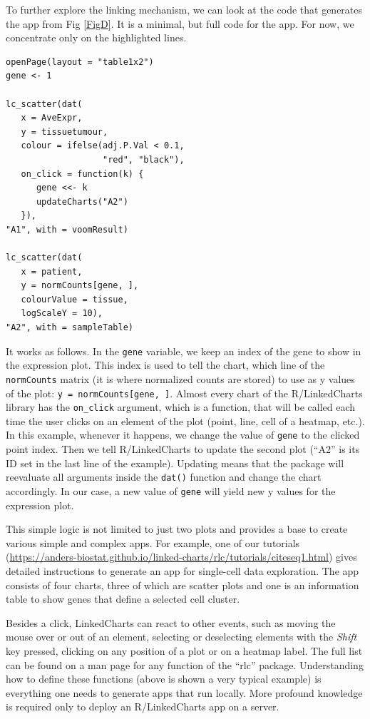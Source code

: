 \documentclass[twocolumn,10pt]{article}
\begin{document}
To further explore the linking mechanism, we can look at the code that generates the app from Fig \ref{FigD}. It is a minimal, but full code for the app. For now, we concentrate only on the highlighted lines.

\begin{verbatim}
openPage(layout = "table1x2")
gene <- 1

lc_scatter(dat(
   x = AveExpr,
   y = tissuetumour,
   colour = ifelse(adj.P.Val < 0.1, 
                   "red", "black"),
   on_click = function(k) {
      gene <<- k
      updateCharts("A2")
   }),
"A1", with = voomResult)

lc_scatter(dat(
   x = patient,
   y = normCounts[gene, ],
   colourValue = tissue, 
   logScaleY = 10),
"A2", with = sampleTable)
\end{verbatim}

It works as follows. In the \texttt{gene} variable, we keep an index of the gene to show in the expression plot. This index is used to tell the chart, which line of the \texttt{normCounts} matrix (it is where normalized counts are stored) to use as y values of the plot: \texttt{y = normCounts[gene, ]}. Almost every chart of the R/LinkedCharts library has the \texttt{on_click} argument, which is a function, that will be called each time the user clicks on an element of the plot (point, line, cell of a heatmap, etc.). In this example, whenever it happens, we change the value of \texttt{gene} to the clicked point index. Then we tell R/LinkedCharts to update the second plot (``A2'' is its ID set in the last line of the example). Updating means that the package will reevaluate all arguments inside the \texttt{dat()} function and change the chart accordingly. In our case, a new value of \texttt{gene} will yield new y values for the expression plot.

This simple logic is not limited to just two plots and provides a base to create various simple and complex apps. For example, one of our tutorials (\url{https://anders-biostat.github.io/linked-charts/rlc/tutorials/citeseq1.html}) gives detailed instructions to generate an app for single-cell data exploration. The app consists of four charts, three of which are scatter plots and one is an information table to show genes that define a selected cell cluster.

Besides a click, LinkedCharts can react to other events, such as moving the mouse over or out of an element, selecting or deselecting elements with the \emph{Shift} key pressed, clicking on any position of a plot or on a heatmap label. The full list can be found on a man page for any function of the ``rlc'' package. Understanding how to define these functions (above is shown a very typical example) is everything one needs to generate apps that run locally. More profound knowledge is required only to deploy an R/LinkedCharts app on a server. 
\end{document}
